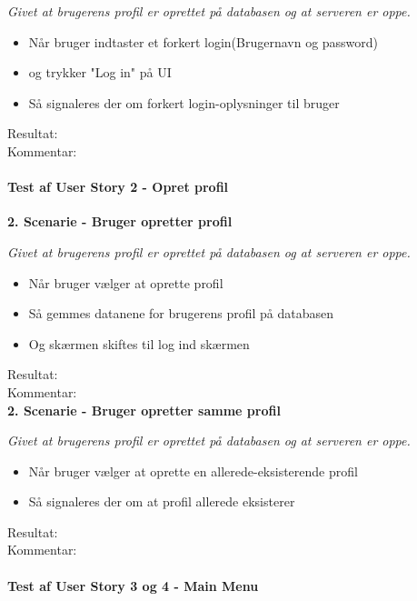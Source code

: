 \textit{Givet at brugerens profil er oprettet på databasen og at serveren er oppe.}

\begin{itemize}
  \item Når bruger indtaster et forkert login(Brugernavn og password)
  \item og trykker "Log in" på UI
  \item Så signaleres der om forkert login-oplysninger til bruger
\end{itemize}

Resultat:\\
Kommentar:\\

\paragraph{Test af User Story 2 - Opret profil}

\textbf{2. Scenarie - Bruger opretter profil}

\textit{Givet at brugerens profil er oprettet på databasen og at serveren er oppe.}

\begin{itemize}
  \item Når bruger vælger at oprette profil
  \item Så gemmes datanene for brugerens profil på databasen
  \item Og skærmen skiftes til log ind skærmen
\end{itemize}

Resultat:\\
Kommentar:\\

\textbf{2. Scenarie - Bruger opretter samme profil}

\textit{Givet at brugerens profil er oprettet på databasen og at serveren er oppe.}

\begin{itemize}
  \item Når bruger vælger at oprette en allerede-eksisterende profil
  \item Så signaleres der om at profil allerede eksisterer
\end{itemize}

Resultat:\\
Kommentar:\\

\paragraph{Test af User Story 3 og 4 - Main Menu}

